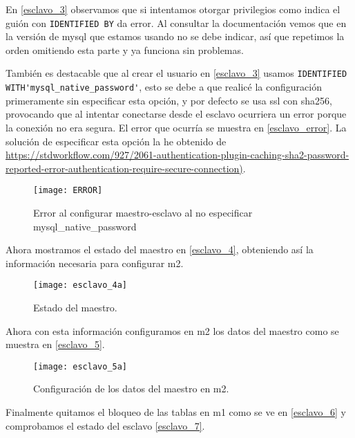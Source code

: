 En \eqref{esclavo_3} observamos que si intentamos otorgar privilegios como indica el guión con \verb|IDENTIFIED BY| da error. Al consultar la documentación vemos que en la versión de mysql que estamos usando no se debe indicar, así que repetimos la orden omitiendo esta parte y ya funciona sin problemas.

También es destacable que al crear el usuario en \eqref{esclavo_3} usamos \verb|IDENTIFIED WITH'mysql_native_password'|, esto se debe a que realicé la configuración primeramente sin especificar esta opción, y por defecto se usa ssl con sha256, provocando que al intentar conectarse desde el esclavo ocurriera un error porque la conexión no era segura. El error que ocurría se muestra en \eqref{esclavo_error}. La solución de especificar esta opción la he obtenido de \href{aquí}{ https://stdworkflow.com/927/2061-authentication-plugin-caching-sha2-password-reported-error-authentication-require-secure-connection)}.

\begin{figure}[h!]
\begin{center}
\caption{Error al configurar maestro-esclavo al no especificar mysql\_native\_password}
\label{esclavo_error}
\texttt{[image: ERROR]}
\end{center}
\end{figure}

Ahora mostramos el estado del maestro en \eqref{esclavo_4}, obteniendo así la información necesaria para configurar m2.

\begin{figure}[h!]
\begin{center}
\caption{Estado del maestro.}
\label{esclavo_4}
\texttt{[image: esclavo\_4a]}
\end{center}
\end{figure}

Ahora con esta información configuramos en m2 los datos del maestro como se muestra en \eqref{esclavo_5}.

\begin{figure}[h!]
\begin{center}
\caption{Configuración de los datos del maestro en m2.}
\label{esclavo_5}
\texttt{[image: esclavo\_5a]}
\end{center}
\end{figure}

Finalmente quitamos el bloqueo de las tablas en m1 como se ve en \eqref{esclavo_6} y comprobamos el estado del esclavo \eqref{esclavo_7}.

